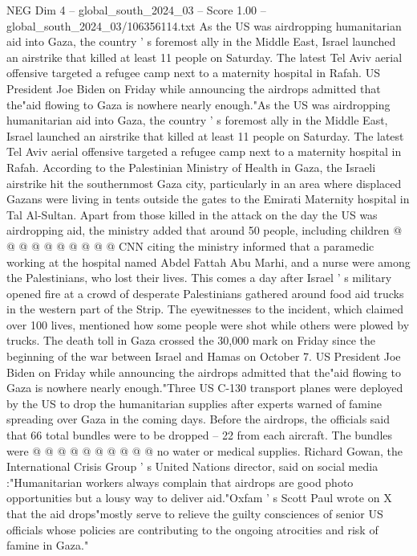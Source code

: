 \begin{textsample}{NEG Dim 4 – global\_south\_2024\_03 – Score 1.00 – global\_south\_2024\_03/106356114.txt}  \label{ex:f4_neg_352}
As the US was airdropping humanitarian aid into Gaza, the country ' s foremost ally in the Middle East, Israel launched an airstrike that killed at least 11 people on Saturday.
The latest Tel Aviv aerial offensive targeted a refugee camp next to a maternity hospital in Rafah.
US President Joe Biden on Friday while announcing the airdrops admitted that the"aid flowing to Gaza is nowhere nearly enough."As the US was airdropping humanitarian aid into Gaza, the country ' s foremost ally in the Middle East, Israel launched an airstrike that killed at least 11 people on Saturday.
The latest Tel Aviv aerial offensive targeted a refugee camp next to a maternity hospital in Rafah.
According to the Palestinian Ministry of Health in Gaza, the Israeli airstrike hit the southernmost Gaza city, particularly in an area where displaced Gazans were living in tents outside the gates to the Emirati Maternity hospital in Tal Al-Sultan.
Apart from those killed in the attack on the day the US was airdropping aid, the ministry added that around 50 people, including children @ @ @ @ @ @ @ @ @ @ CNN citing the ministry informed that a paramedic working at the hospital named Abdel Fattah Abu Marhi, and a nurse were among the Palestinians, who lost their lives.
This comes a day after Israel ' s military opened fire at a crowd of desperate Palestinians gathered around food aid trucks in the western part of the Strip.
The eyewitnesses to the incident, which claimed over 100 lives, mentioned how some people were shot while others were plowed by trucks.
The death toll in Gaza crossed the 30,000 mark on Friday since the beginning of the war between Israel and Hamas on October 7.
US President Joe Biden on Friday while announcing the airdrops admitted that the"aid flowing to Gaza is nowhere nearly enough."Three US C-130 transport planes were deployed by the US to drop the humanitarian supplies after experts warned of famine spreading over Gaza in the coming days.
Before the airdrops, the officials said that 66 total bundles were to be dropped -- 22 from each aircraft.
The bundles were @ @ @ @ @ @ @ @ @ @ no water or medical supplies.
Richard Gowan, the International Crisis Group ' s United Nations director, said on social media :"Humanitarian workers always complain that airdrops are good photo opportunities but a lousy way to deliver aid."Oxfam ' s Scott Paul wrote on X that the aid drops"mostly serve to relieve the guilty consciences of senior US officials whose policies are contributing to the ongoing atrocities and risk of famine in Gaza."

\end{textsample}
